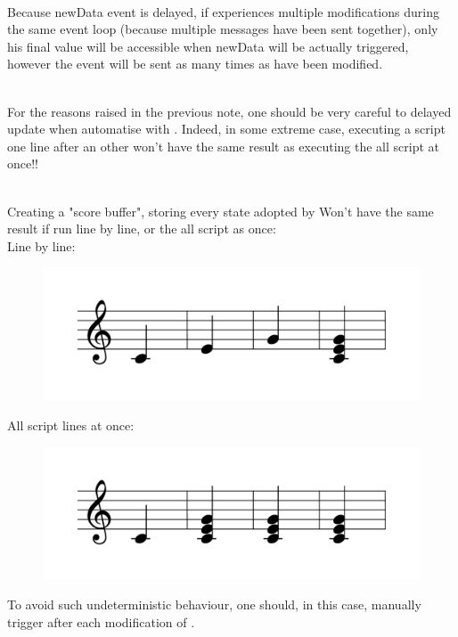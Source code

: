 \note\\
Because newData event is delayed, if  experiences multiple modifications during the same event loop (because multiple  messages have been sent together), only his final value will be accessible when newData will be actually triggered, however the event will be sent as many times as  have been modified.

\\
For the reasons raised in the previous note, one should be very careful to delayed update when automatise  with . Indeed, in some extreme case, executing a script one line after an other won't have the same result as executing the all script at once!!

\selayout
\example\\
Creating a "score buffer", storing every state adopted by 
Won't have the same result if run line by line, or the all script as once:\\
Line by line:
\begin{figure}[H]
\begin{center}
 \includegraphics[scale=0.3]{imgs/autoSingleLine}
\end{center}
\end{figure}

All script lines at once:
\begin{figure}[H]
\begin{center}
 \includegraphics[scale=0.3]{imgs/autoAllScript}
\end{center}
\end{figure}

To avoid such undeterministic behaviour, one should, in this case, manually trigger  after each modification of .
